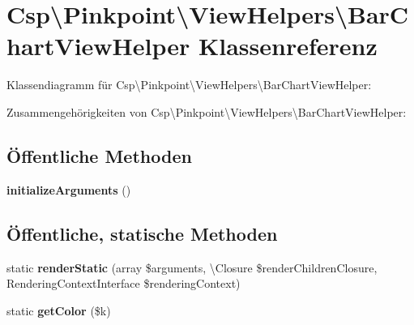 \hypertarget{classCsp_1_1Pinkpoint_1_1ViewHelpers_1_1BarChartViewHelper}{}\section{Csp\textbackslash{}Pinkpoint\textbackslash{}View\+Helpers\textbackslash{}Bar\+Chart\+View\+Helper Klassenreferenz}
\label{classCsp_1_1Pinkpoint_1_1ViewHelpers_1_1BarChartViewHelper}


Klassendiagramm für Csp\textbackslash{}Pinkpoint\textbackslash{}View\+Helpers\textbackslash{}Bar\+Chart\+View\+Helper\+:


Zusammengehörigkeiten von Csp\textbackslash{}Pinkpoint\textbackslash{}View\+Helpers\textbackslash{}Bar\+Chart\+View\+Helper\+:
\subsection*{Öffentliche Methoden}
\begin{DoxyCompactItemize}
\item 
\mbox{\label{classCsp_1_1Pinkpoint_1_1ViewHelpers_1_1BarChartViewHelper_aa3795c5855ac33f0c716849c0e5050a0}} 
{\bfseries initialize\+Arguments} ()
\end{DoxyCompactItemize}
\subsection*{Öffentliche, statische Methoden}
\begin{DoxyCompactItemize}
\item 
\mbox{\label{classCsp_1_1Pinkpoint_1_1ViewHelpers_1_1BarChartViewHelper_ac369d08f0273346556eb14af028c0282}} 
static {\bfseries render\+Static} (array \$arguments, \textbackslash{}Closure \$render\+Children\+Closure, Rendering\+Context\+Interface \$rendering\+Context)
\item 
\mbox{\label{classCsp_1_1Pinkpoint_1_1ViewHelpers_1_1BarChartViewHelper_a21fef828039f5c2397fb39d3a28477dd}} 
static {\bfseries get\+Color} (\$k)
\end{DoxyCompactItemize}
